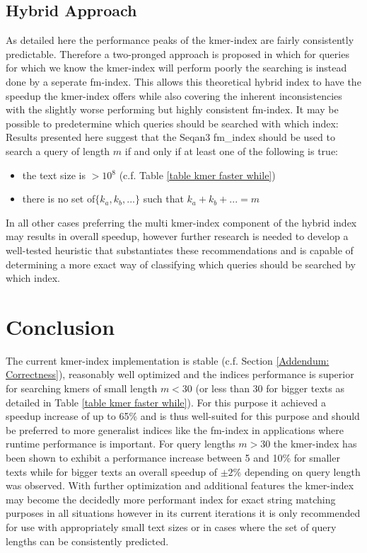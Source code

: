 \section{Hybrid Approach}
As detailed here the performance peaks of the kmer-index are fairly
consistently predictable. Therefore a two-pronged approach is proposed in which
for queries for which we know the kmer-index will perform poorly the
searching is instead done by a seperate fm-index. This allows this theoretical hybrid index
to have the speedup the kmer-index offers while also covering the inherent inconsistencies with the slightly worse performing
but highly consistent fm-index. It may be possible to predetermine
which queries should be searched with which index: Results presented here suggest that
the Seqan3 fm\_index should be used to search a query of length $m$ if and only if at least one of the following is true:
\begin{itemize}
\item the text size is $>10{{}^8}$ (c.f. Table \ref{table kmer faster while})
\item there is no set of$\{k_{a},k_{b},...\}$ such that $k_{a}+k_{b}+...=m$
\end{itemize}
In all other cases preferring the multi kmer-index component of the hybrid index
may results in overall speedup, however further research is needed to develop a well-tested
heuristic that substantiates these recommendations and is capable of determining a more
exact way of classifying which queries should be searched by which index.

\chapter{Conclusion}

The current kmer-index implementation is stable (c.f. Section \ref{Addendum: Correctness}),
reasonably well optimized and the indices performance is superior
for searching kmers of small length $m<30$ (or less than
30 for bigger texts as detailed in Table \ref{table kmer faster while}).
For this purpose it achieved a speedup increase of up to 65\%
and is thus well-suited for this purpose and should be preferred to more generalist
indices like the fm-index in applications where runtime performance is important. For
query lengths $m>30$ the kmer-index has been shown to exhibit a performance
increase between 5 and 10\% for smaller texts
while for bigger texts an overall speedup of $\pm2\%$ depending
on query length was observed. With further optimization and additional features
the kmer-index may become the decidedly more performant index for
exact string matching purposes in all situations however in its current
iterations it is only recommended for use with appropriately small
text sizes or in cases where the set of query lengths can be consistently predicted.



